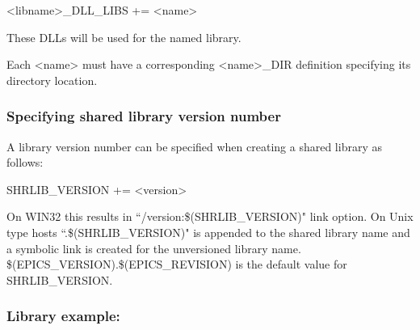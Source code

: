 \begin{description}\item \textless{}libname\textgreater{}\_DLL\_LIBS += \textless{}name\textgreater{}

\end{description}These DLLs will be used for the named library.

Each \textless{}name\textgreater{} must have a corresponding \textless{}name\textgreater{}\_DIR definition specifying its directory location.

\subsubsection{Specifying shared library version number}

A library version number can be specified when creating a shared library as follows:

\begin{description}\item {}SHRLIB\_VERSION += \textless{}version\textgreater{}

\end{description}On WIN32 this results in ``/version:\$(SHRLIB\_VERSION)" link option. On Unix type hosts ``.\$(SHRLIB\_VERSION)" is 
appended to the shared library name and a symbolic link is created for the unversioned library name.  
\$(EPICS\_VERSION).\$(EPICS\_REVISION) is the default value for SHRLIB\_VERSION.

\subsubsection{Library example:}

